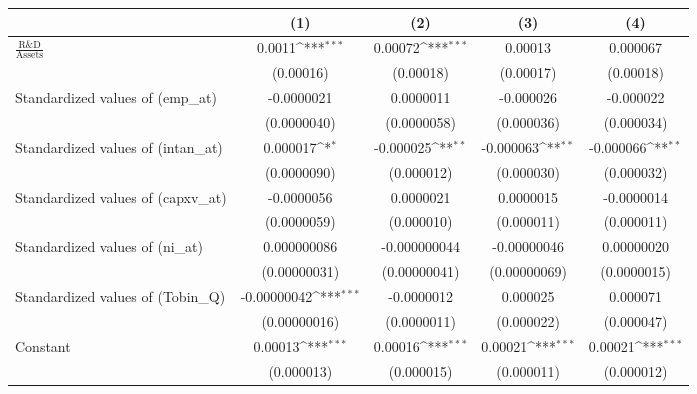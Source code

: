 {
\def\sym#1{\ifmmode^{#1}\else\(^{#1}\)\fi}
\begin{tabular}{l*{4}{c}}
\toprule
                    &\multicolumn{1}{c}{(1)}         &\multicolumn{1}{c}{(2)}         &\multicolumn{1}{c}{(3)}         &\multicolumn{1}{c}{(4)}         \\
\midrule
$\frac{\textrm{R\&D}}{\textrm{Assets}}$&      0.0011\sym{***}&     0.00072\sym{***}&     0.00013         &    0.000067         \\
                    &   (0.00016)         &   (0.00018)         &   (0.00017)         &   (0.00018)         \\
\addlinespace
Standardized values of (emp\_at)     &  -0.0000021         &   0.0000011         &   -0.000026         &   -0.000022         \\
                    & (0.0000040)         & (0.0000058)         &  (0.000036)         &  (0.000034)         \\
\addlinespace
Standardized values of (intan\_at)     &    0.000017\sym{*}  &   -0.000025\sym{**} &   -0.000063\sym{**} &   -0.000066\sym{**} \\
                    & (0.0000090)         &  (0.000012)         &  (0.000030)         &  (0.000032)         \\
\addlinespace
Standardized values of (capxv\_at)     &  -0.0000056         &   0.0000021         &   0.0000015         &  -0.0000014         \\
                    & (0.0000059)         &  (0.000010)         &  (0.000011)         &  (0.000011)         \\
\addlinespace
Standardized values of (ni\_at)     & 0.000000086         &-0.000000044         & -0.00000046         &  0.00000020         \\
                    &(0.00000031)         &(0.00000041)         &(0.00000069)         & (0.0000015)         \\
\addlinespace
Standardized values of (Tobin\_Q)     & -0.00000042\sym{***}&  -0.0000012         &    0.000025         &    0.000071         \\
                    &(0.00000016)         & (0.0000011)         &  (0.000022)         &  (0.000047)         \\
\addlinespace
Constant            &     0.00013\sym{***}&     0.00016\sym{***}&     0.00021\sym{***}&     0.00021\sym{***}\\
                    &  (0.000013)         &  (0.000015)         &  (0.000011)         &  (0.000012)         \\

\end{tabular}}
